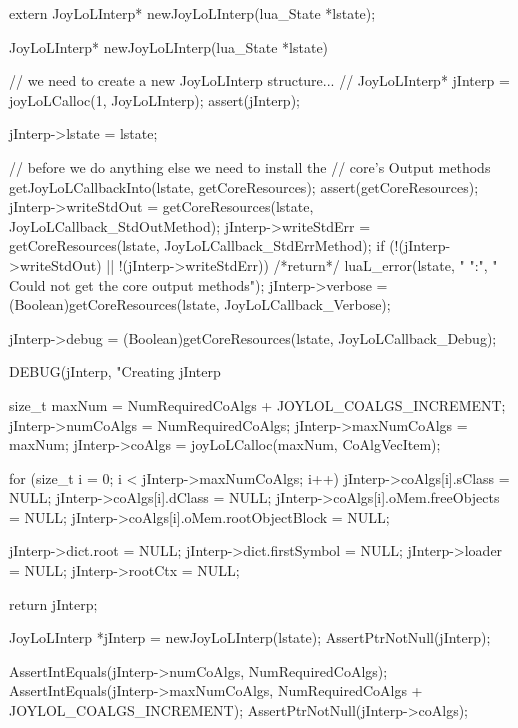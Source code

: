 \startCHeader
extern JoyLoLInterp* newJoyLoLInterp(lua_State *lstate);
\stopCHeader
{}

\startCCode
JoyLoLInterp* newJoyLoLInterp(lua_State *lstate) {
  // we need to create a new JoyLoLInterp structure...
  //
  JoyLoLInterp* jInterp = joyLoLCalloc(1, JoyLoLInterp);
  assert(jInterp);

  jInterp->lstate = lstate;
  
  // before we do anything else we need to install the
  // core's Output methods
  getJoyLoLCallbackInto(lstate, getCoreResources);
  assert(getCoreResources);
  jInterp->writeStdOut =
    getCoreResources(lstate, JoyLoLCallback_StdOutMethod);
  jInterp->writeStdErr =
    getCoreResources(lstate, JoyLoLCallback_StdErrMethod);
  if (!(jInterp->writeStdOut) || !(jInterp->writeStdErr)) {
    /*return*/ luaL_error(lstate, "%
      "\nERROR:\n",
      "  Could not get the core output methods\n");
  }
  jInterp->verbose = 
    (Boolean)getCoreResources(lstate, JoyLoLCallback_Verbose);
    
  jInterp->debug = 
    (Boolean)getCoreResources(lstate, JoyLoLCallback_Debug);

  DEBUG(jInterp, "Creating jInterp %
    
  size_t maxNum =
    NumRequiredCoAlgs + JOYLOL_COALGS_INCREMENT;
  jInterp->numCoAlgs    = NumRequiredCoAlgs;
  jInterp->maxNumCoAlgs = maxNum;
  jInterp->coAlgs    = joyLoLCalloc(maxNum, CoAlgVecItem);
  
  for (size_t i = 0; i < jInterp->maxNumCoAlgs; i++) {
    jInterp->coAlgs[i].sClass               = NULL;
    jInterp->coAlgs[i].dClass               = NULL;
    jInterp->coAlgs[i].oMem.freeObjects     = NULL;
    jInterp->coAlgs[i].oMem.rootObjectBlock = NULL; 
  }
  
  jInterp->dict.root        = NULL;
  jInterp->dict.firstSymbol = NULL;
  jInterp->loader           = NULL;
  jInterp->rootCtx          = NULL;
    
  return jInterp;
}
\stopCCode


\startCTest
  JoyLoLInterp *jInterp = newJoyLoLInterp(lstate);
  AssertPtrNotNull(jInterp);
  
  AssertIntEquals(jInterp->numCoAlgs,
    NumRequiredCoAlgs);
  AssertIntEquals(jInterp->maxNumCoAlgs,
    NumRequiredCoAlgs + JOYLOL_COALGS_INCREMENT);
  AssertPtrNotNull(jInterp->coAlgs);
  

